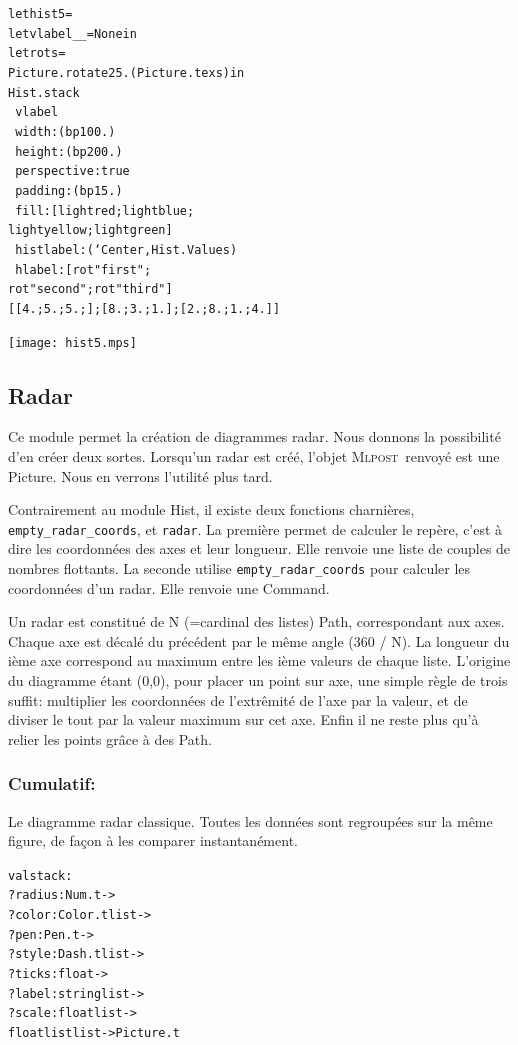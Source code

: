 \documentclass[a4paper,12pt]{article}
\newcommand{\mlpost}{\textsc{Mlpost}}
\begin{document}
\bigskip

\begin{minipage}{0.5\linewidth}
  \begin{alltt}
    let hist5 =
    let vlabel _ _ = None in
    let rot s = 
    Picture.rotate 25. (Picture.tex s) in
    Hist.stack
    ~vlabel
    ~width:(bp 100.)
    ~height:(bp 200.)
    ~perspective:true 
    ~padding:(bp 15.)
    ~fill:[lightred;lightblue;
      lightyellow;lightgreen]
    ~histlabel:(`Center, Hist.Values)
    ~hlabel:[rot "first";
      rot "second";rot "third" ]
    [[4.;5.;5.;]; [8.;3.;1.]; [2.;8.;1.;4.]]
  \end{alltt}
\end{minipage}
\begin{minipage}{0.5\linewidth}
\begin{center}
\texttt{[image: hist5.mps]}
\end{center}
\end{minipage}

\subsection{Radar}
Ce module permet la création de diagrammes radar.
Nous donnons la possibilité d'en créer deux sortes.
Lorsqu'un radar est créé, l'objet \mlpost\ renvoyé est une Picture.
Nous en verrons l'utilité plus tard.
\bigskip 

Contrairement au module Hist, il existe deux fonctions charnières, \texttt{empty\_radar\_coords}, et \texttt{radar}.
La première permet de calculer le repère, c'est à dire les coordonnées des axes et leur longueur. Elle renvoie une liste de couples de nombres flottants.
La seconde utilise \texttt{empty\_radar\_coords} pour calculer les coordonnées d'un radar. Elle renvoie une Command.
\bigskip 

Un radar est constitué de N (=cardinal des listes) Path, correspondant aux axes. Chaque axe est décalé du précédent par le même angle (360 / N).
La longueur du ième axe correspond au maximum entre les ième valeurs de chaque liste. L'origine du diagramme étant (0,0), pour placer un point sur axe, une simple règle de trois suffit: multiplier les coordonnées de l'extrêmité de l'axe par la valeur, et de diviser le tout par la valeur maximum sur cet axe. Enfin il ne reste plus qu'à relier les points grâce à des Path.

\subsubsection{Cumulatif:}
Le diagramme radar classique. Toutes les données sont regroupées sur la même figure, de façon à les comparer instantanément. 
\begin{alltt}
  val stack :
  ?radius:Num.t ->
  ?color:Color.t list ->
  ?pen:Pen.t ->
  ?style:Dash.t list ->
  ?ticks:float ->
  ?label:string list ->
  ?scale:float list ->
  float list list -> Picture.t
\end{alltt}
\end{document}
